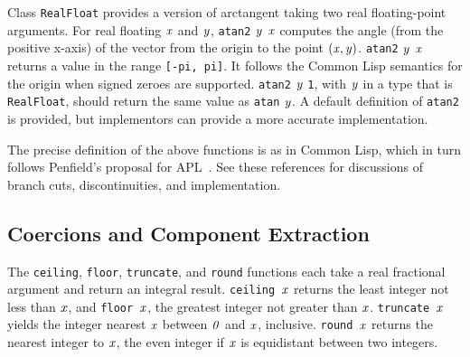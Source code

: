 Class \mbox{\tt RealFloat} provides a version of arctangent
taking two real floating-point arguments.
For real floating \mbox{$\it x$} and \mbox{$\it y$}, \mbox{\tt atan2} \mbox{$\it y$} \mbox{$\it x$}
computes the angle (from the positive x-axis) of the vector from the origin
to the point \mbox{$\it (x,y)$}.  \mbox{\tt atan2} \mbox{$\it y$} \mbox{$\it x$}
returns a value in the range \mbox{\tt [-pi,\ pi]}.  It
follows the Common Lisp semantics for the origin when signed zeroes are
supported.  \mbox{\tt atan2} \mbox{$\it y$} \mbox{\tt 1}, with \mbox{$\it y$} in a type that is \mbox{\tt RealFloat}, should return the
same value as \mbox{\tt atan} \mbox{$\it y$}.  A default definition of \mbox{\tt atan2} is provided, but
implementors can provide a more accurate implementation. 

The precise definition of the above functions is as in Common Lisp,
which in turn follows Penfield's proposal for
APL~\cite{penfield:complex-apl}.  See these references for discussions
of branch cuts, discontinuities, and implementation.

\subsection{Coercions and Component Extraction}
\label{coercion}

The \mbox{\tt ceiling}, \mbox{\tt floor},
\mbox{\tt truncate}, and \mbox{\tt round}
functions each take a real fractional argument and return an integral
result.  \mbox{\mbox{\tt ceiling} \mbox{$\it x$}} returns the least integer not less than \mbox{$\it x$}, and
\mbox{\mbox{\tt floor} \mbox{$\it x$}}, the greatest integer not greater than \mbox{$\it x$}.  \mbox{\mbox{\tt truncate} \mbox{$\it x$}}
yields the integer nearest \mbox{$\it x$} between \mbox{$\it 0$} and \mbox{$\it x$}, inclusive.
\mbox{\mbox{\tt round} \mbox{$\it x$}} returns the nearest integer to \mbox{$\it x$}, the even integer if
\mbox{$\it x$} is equidistant between two integers.

%
% 

